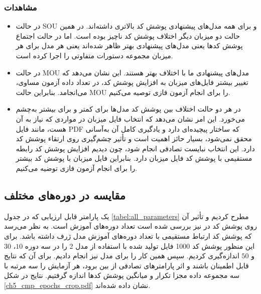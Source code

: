 \subsubsection{مشاهدات}
\begin{itemize}
	\item{
در حالت \gls{SOU} و برای  همه مدل‌های پیشنهادی پوشش کد بالاتری داشته‌اند. در همین حالت دو میزبان دیگر اختلاف پوشش کد ناچیز بوده است. اما در حالت اجتماع پوشش کدها یعنی  مدل‌های پیشنهادی بهتر ظاهر شده‌اند یعنی هر مدل برای هر میزبان مجموعه دستورات متفاوتی را اجرا کرده است.
}

	\item{
	در حالت \gls{MOU} مدل‌های پیشنهادی ما با اختلاف بهتر هستند. این نشان می‌دهد که تغییر بیشتر فایل‌های میزبان به افزایش پوشش کد، در تعداد داده آزمون مساوی، می‌انجامد. بنابراین حالت \gls{MOU} را برای انجام آزمون فازی توصیه می‌کنیم. 
}
\item{
	در هر دو حالت اختلاف بین پوشش کد مدل‌ها برای  کمتر و برای  بیشتر به‌چشم می‌خورد. این امر نشان می‌دهد که انتخاب فایل میزبان در مواردی که نیاز به آن هست، مانند فایل \gls{PDF} که ساختار پیچیده‌ای دارد و یادگیری کامل آن به‌آسانی محقق نمی‌شود، بسیار حائز اهمیت است و تأثیر چشم‌گیری روی ارتقاء پوشش کد دارد. این انتخاب نبایست تصادفی انجام شود، چون دیدیم افزایش پوشش کد رابطه مستقیمی با پوشش کد فایل میزبان دارد. بنابراین فایل میزبان با پوشش کد بیشتر را برای انجام آزمون فازی توضیه می‌کنیم.
	
}

\end{itemize}


\subsection{مقایسه در دوره‌های مختلف}\label{sec:epochcompare}

یک پارامتر قابل ارزیابی که در جدول \ref{tabel:all_parameters} مطرح کردیم و تأثیر آن روی پوشش کد در 
\cite{Godefroid:2017:LML:3155562.3155573}
نیز بررسی شده است تعداد دوره‌های آموزش است. به نظر می‌رسد که پوشش کد ارتباط مستقیمی با تعداد دوره‌های آموزش مدل ژرف داشته باشد. برای این منظور پوشش کد 1000 فایل تولید شده با استفاده از مدل 2 را در سه دوره $10$، $30$ و $50$ اندازه‌گیری کردیم. سپس همین کار را برای مدل  نیز انجام دادیم. برای آن که نتایج قابل اطمینان باشند و اثر پارامترهای تصادفی از بین برود، هر آزمایش را سه مرتبه با سه مجموعه داده مجزا تکرار و میانگین پوشش کدها اندازه گرفتیم. نتایج در شکل \ref{ch5_cmp_epochs_crop.pdf} نشان داده شده‌اند.



